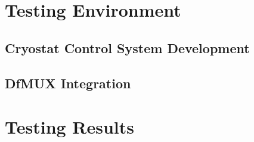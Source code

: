 \documentclass[iop]{emulateapj}
\begin{document}
\section{Testing Environment}
\label{testing_section}



\subsection{Cryostat Control System Development}

\subsection{DfMUX Integration}



\section{Testing Results}
\label{results_section}
\end{document}
